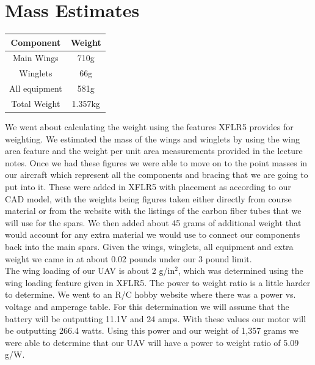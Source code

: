 \section{Mass Estimates}

\begin{center}
\begin{tabular}{c|c} 
 \hline
 Component & Weight \\
 \hline\hline
 Main Wings & 710g \\
 \hline
 Winglets & 66g \\
 \hline
 All equipment & 581g \\
 \hline
 Total Weight & 1.357kg \\
 \hline
\end{tabular}
\end{center}

We went about calculating the weight using the features XFLR5 provides for weighting. We estimated the mass of the wings and winglets by using the wing area feature and the weight per unit area measurements provided in the lecture notes. Once we had these figures we were able to move on to the point masses in our aircraft which represent all the components and bracing that we are going to put into it. These were added in XFLR5 with placement as according to our CAD model, with the weights being figures taken either directly from course material or from the website with the listings of the carbon fiber tubes that we will use for the spars. We then added about 45 grams of additional weight that would account for any extra material we would use to connect our components back into the main spars. Given the wings, winglets, all equipment and extra weight we came in at about 0.02 pounds under our 3 pound limit. \\

The wing loading of our UAV is about 2 g/in$^2$, which was determined using the wing loading feature given in XFLR5. The power to weight ratio is a little harder to determine. We went to an R/C hobby website where there was a power vs. voltage and amperage table. For this determination we will assume that the battery will be outputting 11.1V and 24 amps. With these values our motor will be outputting 266.4 watts. Using this power and our weight of 1,357 grams we were able to determine that our UAV will have a power to weight ratio of 5.09 g/W.



